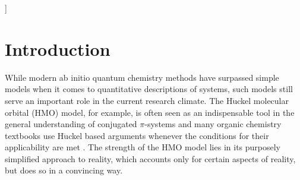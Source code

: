 \documentclass[twoside,twocolumn,9pt]{article}
\begin{document}
  ]

\renewcommand*\rmdefault{bch}\normalfont\upshape
\rmfamily
\section*{}
\vspace{-1cm}










\section{Introduction}
While modern ab initio quantum chemistry methods have surpassed simple models when it comes to quantitative descriptions of systems, such models still serve an important role in the current research climate. The H$\ddot{\text{u}}$ckel molecular orbital (HMO) model, for example, is often seen as an indispensable tool in the general understanding of conjugated $\pi$-systems and many organic chemistry textbooks use H$\ddot{\text{u}}$ckel based arguments whenever the conditions for their applicability are met \cite{kutzelnigg2007}. The strength of the HMO model lies in its purposely simplified approach to reality, which accounts only for certain aspects of reality, but does so in a convincing way.
\end{document}
